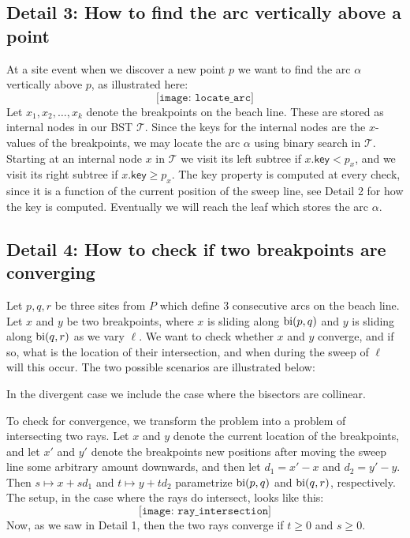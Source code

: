 \subsection*{Detail 3: How to find the arc vertically above a point}
At a site event when we discover a new point $p$ we want to find the arc $\alpha$ vertically above $p$, as illustrated here:
\[
    \texttt{[image: locate\_arc]}
\]
Let $x_1, x_2, \ldots, x_k$ denote the breakpoints on the beach line. These are stored as internal nodes in our BST $\mathcal{T}$. Since the keys for the internal nodes are the $x$-values of the breakpoints, we may locate the arc $\alpha$ using binary search in $\mathcal{T}$. Starting at an internal node $x$ in $\mathcal{T}$ we visit its left subtree if $x\textsf{.key} < p_x$, and we visit its right subtree if $x\textsf{.key} \geq p_x$. The key property is computed at every check, since it is a function of the current position of the sweep line, see Detail 2 for how the key is computed. Eventually we will reach the leaf which stores the arc $\alpha$.

\subsection*{Detail 4: How to check if two breakpoints are converging}
Let $p, q, r$ be three sites from $P$ which define 3 consecutive arcs on the beach line. Let $x$ and $y$ be two breakpoints, where $x$ is sliding along $\operatorname{bi}(p, q)$ and $y$ is sliding along $\operatorname{bi}(q, r)$ as we vary $\ell$. We want to check whether $x$ and $y$ converge, and if so, what is the location of their intersection, and when during the sweep of $\ell$ will this occur. The two possible scenarios are illustrated below:
\begin{figure}[H]
    \centering
\end{figure}
In the divergent case we include the case where the bisectors are collinear. 

To check for convergence, we transform the problem into a problem of intersecting two rays. Let $x$ and $y$ denote the current location of the breakpoints, and let $x'$ and $y'$ denote the breakpoints new positions after moving the sweep line some arbitrary amount downwards, and then let $d_1 = x' - x$ and $d_2 = y' - y$. Then $s \mapsto x + s d_1$ and $t \mapsto y + t d_2$ parametrize $\operatorname{bi}(p, q)$ and $\operatorname{bi}(q, r)$, respectively. The setup, in the case where the rays do intersect, looks like this:
\[
    \texttt{[image: ray\_intersection]}
\]
Now, as we saw in Detail 1, then the two rays converge if $t \geq 0$ and $s \geq 0$.

